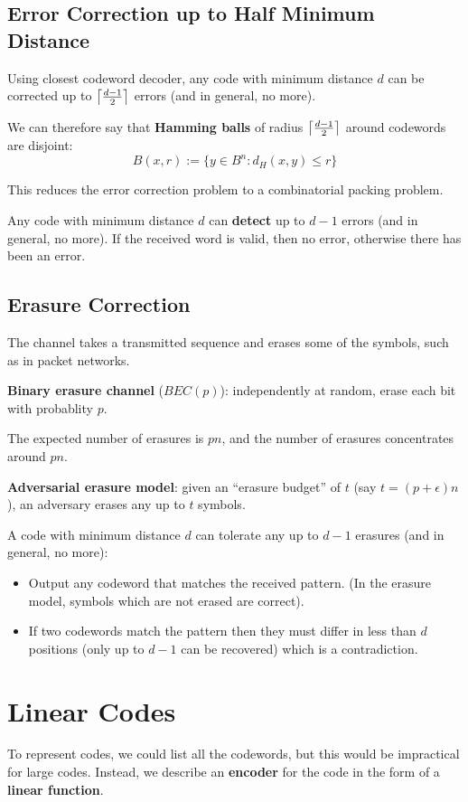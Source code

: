 \documentclass[11pt]{article}
\DeclarePairedDelimiter\ceil{\lceil}{\rceil}
\begin{document}
\subsection{Error Correction up to Half Minimum Distance}
Using closest codeword decoder, any code with minimum distance $d$ can be corrected up to $\ceil*{\frac{d - 1}{2}}$ errors (and in general, no more).

We can therefore say that \textbf{Hamming balls} of radius $\ceil*{\frac{d - 1}{2}}$ around codewords are disjoint:
\[
  B(x, r) := \{ y \in B^n : d_H (x, y) \leq r \}
\]

This reduces the error correction problem to a combinatorial packing problem.

Any code with minimum distance $d$ can \textbf{detect} up to $d - 1$ errors (and in general, no more).
If the received word is valid, then no error, otherwise there has been an error.

\subsection{Erasure Correction}
The channel takes a transmitted sequence and erases some of the symbols, such as in packet networks.

\textbf{Binary erasure channel} ($BEC(p)$): independently at random, erase each bit with probablity $p$.

The expected number of erasures is $pn$, and the number of erasures concentrates around $pn$.

\textbf{Adversarial erasure model}: given an ``erasure budget'' of $t$ (say $t = (p + \epsilon)n$), an adversary erases any up to $t$ symbols.

A code with minimum distance $d$ can tolerate any up to $d - 1$ erasures (and in general, no more):
\begin{itemize}
  \item Output any codeword that matches the received pattern. (In the erasure model, symbols which are not erased are correct).
  \item If two codewords match the pattern then they must differ in less than $d$ positions (only up to $d - 1$ can be recovered) which is a contradiction.
\end{itemize}

\section{Linear Codes}
To represent codes, we could list all the codewords, but this would be impractical for large codes.
Instead, we describe an \textbf{encoder} for the code in the form of a \textbf{linear function}.
\end{document}
